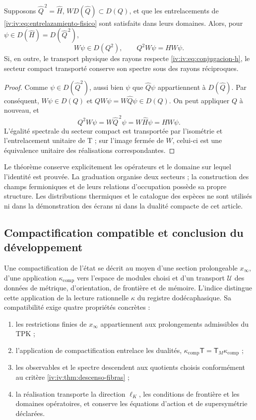 \begin{theorem}
\label{iv:iv:thm:supercarga-transporte}
Supposons \(\widehat Q^{\,2}=\widehat H\),
\(W D(\widehat Q)\subset D(Q)\), et que les
entrelacements de \eqref{iv:iv:eq:entrelazamiento-fisico}
sont satisfaits dans leurs domaines. Alors, pour
\(\psi\in D(\widehat H)=D(\widehat Q^{\,2})\),
\[
 W\psi\in D(Q^2),\qquad Q^2W\psi=HW\psi.
\]
Si, en outre, le transport physique des rayons respecte
\eqref{iv:iv:eq:conjugacion-h}, le secteur compact
transporté conserve son spectre sous des rayons réciproques.
\end{theorem}
\begin{proof}
Comme \(\psi\in D(\widehat Q^2)\), aussi bien
\(\psi\) que \(\widehat Q\psi\) appartiennent
à \(D(\widehat Q)\). Par conséquent, \(W\psi\in D(Q)\)
et \(QW\psi=W\widehat Q\psi\in D(Q)\). On peut
appliquer \(Q\) à nouveau, et
\[
 Q^2W\psi=W\widehat Q^{\,2}\psi
          =W\widehat H\psi=HW\psi.
\]
L’égalité spectrale du secteur compact est transportée
par l’isométrie et l’entrelacement unitaire de T ;
sur l’image fermée de \(W\), celui-ci est une
équivalence unitaire des réalisations correspondantes.
\end{proof}

Le théorème conserve explicitement les opérateurs et le
domaine sur lequel l’identité est prouvée. La
graduation organise deux secteurs ; la construction des
champs fermioniques et de leurs relations d’occupation possède
sa propre structure. Les distributions thermiques et le
catalogue des espèces ne sont utilisés ni dans la démonstration
des écrans ni dans la dualité compacte de cet
article.

\subsection{Compactification compatible et conclusion du développement}

Une compactification de l’état se décrit au moyen
d’une section prolongeable \(x_\infty\), d’une application
\(\kappa_{\mathrm{comp}}\) vers l’espace de modules
choisi et d’un transport \(\mathcal U\) des données
de métrique, d’orientation, de frontière et de mémoire. L’indice
distingue cette application de la lecture rationnelle
\(\kappa\) du registre dodécaphasique. Sa compatibilité
exige quatre propriétés concrètes :
\begin{enumerate}
\item les restrictions finies de \(x_\infty\)
      appartiennent aux prolongements admissibles du TPK ;
\item l’application de compactification entrelace les dualités,
      \(\kappa_{\mathrm{comp}}\mathsf T
        =\mathsf T_M\kappa_{\mathrm{comp}}\) ;
\item les observables et le spectre descendent aux
      quotients choisis conformément au critère
      \ref{iv:iv:thm:descenso-fibras} ;
\item la réalisation transporte la direction
      \(\ell_K\), les conditions de frontière et les
      domaines opératoires, et conserve les équations
      d’action et de supersymétrie déclarées.
\end{enumerate}

